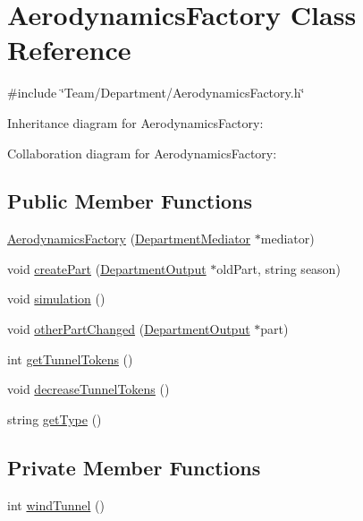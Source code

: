 \hypertarget{classAerodynamicsFactory}{}\section{Aerodynamics\+Factory Class Reference}
\label{classAerodynamicsFactory}


{\ttfamily \#include \char`\"{}Team/\+Department/\+Aerodynamics\+Factory.\+h\char`\"{}}



Inheritance diagram for Aerodynamics\+Factory\+:


Collaboration diagram for Aerodynamics\+Factory\+:
\subsection*{Public Member Functions}
\begin{DoxyCompactItemize}
\item 
\hyperlink{classAerodynamicsFactory_a46f12bf52bad9b98d19f6dcd3a04c384}{Aerodynamics\+Factory} (\hyperlink{classDepartmentMediator}{Department\+Mediator} $\ast$mediator)
\item 
void \hyperlink{classAerodynamicsFactory_a2c6e6ce04d21da014e3c0c6affe423ae}{create\+Part} (\hyperlink{classDepartmentOutput}{Department\+Output} $\ast$old\+Part, string season)
\item 
void \hyperlink{classAerodynamicsFactory_ab8da5b4d88a649174376d08d17503d30}{simulation} ()
\item 
void \hyperlink{classAerodynamicsFactory_a873e60729f4e8a74608fbf29322cf2f6}{other\+Part\+Changed} (\hyperlink{classDepartmentOutput}{Department\+Output} $\ast$part)
\item 
int \hyperlink{classAerodynamicsFactory_a687a3fcb4eeabf97d8c024cfb63406e5}{get\+Tunnel\+Tokens} ()
\item 
void \hyperlink{classAerodynamicsFactory_a244210a6b33080c3426d486d09187717}{decrease\+Tunnel\+Tokens} ()
\item 
string \hyperlink{classAerodynamicsFactory_a3b0af6c00d4a8549164b3d5ec9a1f256}{get\+Type} ()
\end{DoxyCompactItemize}
\subsection*{Private Member Functions}
\begin{DoxyCompactItemize}
\item 
int \hyperlink{classAerodynamicsFactory_a3bfc0efb95b639e586eaa0a45f91fa2b}{wind\+Tunnel} ()
\end{DoxyCompactItemize}
